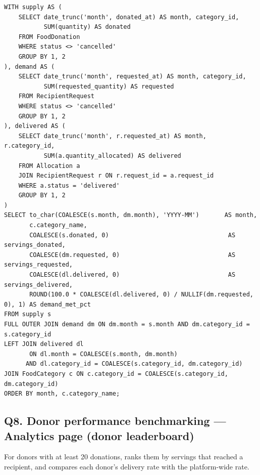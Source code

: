 \documentclass[11pt,letterpaper]{article}
\begin{document}
\begin{lstlisting}
WITH supply AS (
    SELECT date_trunc('month', donated_at) AS month, category_id,
           SUM(quantity) AS donated
    FROM FoodDonation
    WHERE status <> 'cancelled'
    GROUP BY 1, 2
), demand AS (
    SELECT date_trunc('month', requested_at) AS month, category_id,
           SUM(requested_quantity) AS requested
    FROM RecipientRequest
    WHERE status <> 'cancelled'
    GROUP BY 1, 2
), delivered AS (
    SELECT date_trunc('month', r.requested_at) AS month, r.category_id,
           SUM(a.quantity_allocated) AS delivered
    FROM Allocation a
    JOIN RecipientRequest r ON r.request_id = a.request_id
    WHERE a.status = 'delivered'
    GROUP BY 1, 2
)
SELECT to_char(COALESCE(s.month, dm.month), 'YYYY-MM')       AS month,
       c.category_name,
       COALESCE(s.donated, 0)                                 AS servings_donated,
       COALESCE(dm.requested, 0)                              AS servings_requested,
       COALESCE(dl.delivered, 0)                              AS servings_delivered,
       ROUND(100.0 * COALESCE(dl.delivered, 0) / NULLIF(dm.requested, 0), 1) AS demand_met_pct
FROM supply s
FULL OUTER JOIN demand dm ON dm.month = s.month AND dm.category_id = s.category_id
LEFT JOIN delivered dl
       ON dl.month = COALESCE(s.month, dm.month)
      AND dl.category_id = COALESCE(s.category_id, dm.category_id)
JOIN FoodCategory c ON c.category_id = COALESCE(s.category_id, dm.category_id)
ORDER BY month, c.category_name;
\end{lstlisting}

\subsection*{Q8. Donor performance benchmarking --- Analytics page (donor leaderboard)}
For donors with at least 20 donations, ranks them by servings that reached a recipient, and compares each donor's delivery rate with the platform-wide rate.
\end{document}
